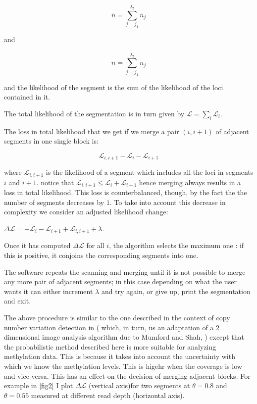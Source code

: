 \documentclass[12pt]{amsart}
\newcommand{\lik}{\ensuremath{\mathcal{L}}}
\begin{document}
\[
\overline{n}=\sum_{j=j_1}^{j_2} \overline{n}_j
\]

and

\[
n=\sum_{j=j_1}^{j_2} n_j
\]

and the likelihood of the segment is the sum of the likelihood of the loci contained in it.

The total likelihood of the segmentation is in turn given by 
$\mathcal{L}=\sum_i\mathcal{L}_i$.

The loss in 
total likelihood that we get if we merge a pair $(i,i+1)$ of 
adjacent segments in one single block is:

\[\mathcal{L}_{i,i+1}-\mathcal{L}_i-\mathcal{L}_{i+1}\]

where $\mathcal{L}_{i,i+1}$ is the likelihood of a segment which includes
all the loci in segments $i$ and $i+1$.
notice that $\mathcal{L}_{i,i+1} \leq \mathcal{L}_i+\mathcal{L}_{i+1}$ hence merging always 
results in a loss in total 
likelihood. This loss is counterbalanced, though, by the fact the the number 
of segments decreases by $1$. To take into account this decrease in 
complexity we consider an adjusted likelihood change:

$\Delta  \lik = -\mathcal{L}_i-\mathcal{L}_{i+1}+\mathcal{L}_{i,i+1} + \lambda$.

Once it has computed 
$\Delta  \lik$ for all $i$, the algorithm selects the maximum 
one : if this is positive, it conjoins the corresponding segments into one.

The software repeats the scanning and merging until it is not possible to 
merge any more pair of adjacent segments; in this case depending on what the 
user wants it can either increment $\lambda$ and try again, 
or give up, print the segmentation and exit.

The above procedure is similar to the one
described in the context of copy number variation detection in \cite{vega} 
( which, in turn, us an adaptation 
of a 2 dimensional image analysis algorithm due to Mumford and Shah, 
\cite{mumfordshah}) except that the probabilistic method  described
here is more suitable for analyzing methylation data. This is because it takes into account the
uncertainty with which we know the methylation levels. This is higehr when the coverage is low and vice versa.
This has an effect on the decision of merging adjacent blocks. For example in \ref{fig2} I plot
$\Delta  \lik$  (vertical axis)for two segments at $\theta=0.8$ and $\theta=0.55$ measured at different read depth
(horizontal axis).
\end{document}
